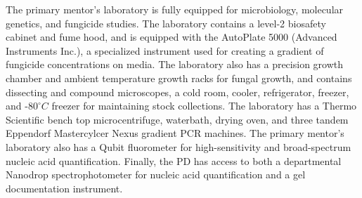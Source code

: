 \documentclass[12pt,letterpaper]{article}
\title{\ruleline{Equipment}}
\begin{document}
\maketitle

The primary mentor's laboratory is fully equipped for microbiology, molecular genetics, and fungicide studies. The laboratory contains a level-2 biosafety cabinet and fume hood, and is equipped with the AutoPlate 5000 (Advanced Instruments Inc.), a specialized instrument used for creating a gradient of fungicide concentrations on media. The laboratory also has a precision growth chamber and ambient temperature growth racks for fungal growth, and contains dissecting and compound microscopes, a cold room, cooler, refrigerator, freezer, and -$80^{\circ}C$ freezer for maintaining stock collections. The laboratory has a Thermo Scientific bench top microcentrifuge, waterbath, drying oven, and three tandem Eppendorf Mastercylcer Nexus gradient PCR machines. The primary mentor's laboratory also has a Qubit fluorometer for high-sensitivity and broad-spectrum nucleic acid quantification. Finally, the PD has access to both a departmental Nanodrop spectrophotometer for nucleic acid quantification and a gel documentation instrument.
\end{document}
